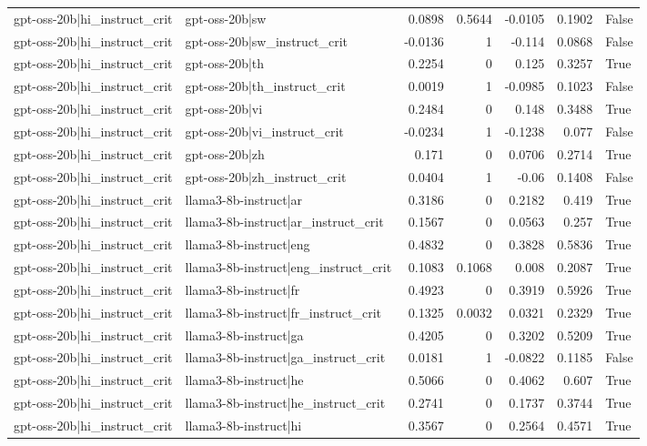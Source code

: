 \begin{table}
\begin{tabular}{l l r r r r l}
gpt-oss-20b|hi_instruct_crit & gpt-oss-20b|sw & 0.0898 & 0.5644 & -0.0105 & 0.1902 & False \\
gpt-oss-20b|hi_instruct_crit & gpt-oss-20b|sw_instruct_crit & -0.0136 & 1 & -0.114 & 0.0868 & False \\
gpt-oss-20b|hi_instruct_crit & gpt-oss-20b|th & 0.2254 & 0 & 0.125 & 0.3257 & True \\
gpt-oss-20b|hi_instruct_crit & gpt-oss-20b|th_instruct_crit & 0.0019 & 1 & -0.0985 & 0.1023 & False \\
gpt-oss-20b|hi_instruct_crit & gpt-oss-20b|vi & 0.2484 & 0 & 0.148 & 0.3488 & True \\
gpt-oss-20b|hi_instruct_crit & gpt-oss-20b|vi_instruct_crit & -0.0234 & 1 & -0.1238 & 0.077 & False \\
gpt-oss-20b|hi_instruct_crit & gpt-oss-20b|zh & 0.171 & 0 & 0.0706 & 0.2714 & True \\
gpt-oss-20b|hi_instruct_crit & gpt-oss-20b|zh_instruct_crit & 0.0404 & 1 & -0.06 & 0.1408 & False \\
gpt-oss-20b|hi_instruct_crit & llama3-8b-instruct|ar & 0.3186 & 0 & 0.2182 & 0.419 & True \\
gpt-oss-20b|hi_instruct_crit & llama3-8b-instruct|ar_instruct_crit & 0.1567 & 0 & 0.0563 & 0.257 & True \\
gpt-oss-20b|hi_instruct_crit & llama3-8b-instruct|eng & 0.4832 & 0 & 0.3828 & 0.5836 & True \\
gpt-oss-20b|hi_instruct_crit & llama3-8b-instruct|eng_instruct_crit & 0.1083 & 0.1068 & 0.008 & 0.2087 & True \\
gpt-oss-20b|hi_instruct_crit & llama3-8b-instruct|fr & 0.4923 & 0 & 0.3919 & 0.5926 & True \\
gpt-oss-20b|hi_instruct_crit & llama3-8b-instruct|fr_instruct_crit & 0.1325 & 0.0032 & 0.0321 & 0.2329 & True \\
gpt-oss-20b|hi_instruct_crit & llama3-8b-instruct|ga & 0.4205 & 0 & 0.3202 & 0.5209 & True \\
gpt-oss-20b|hi_instruct_crit & llama3-8b-instruct|ga_instruct_crit & 0.0181 & 1 & -0.0822 & 0.1185 & False \\
gpt-oss-20b|hi_instruct_crit & llama3-8b-instruct|he & 0.5066 & 0 & 0.4062 & 0.607 & True \\
gpt-oss-20b|hi_instruct_crit & llama3-8b-instruct|he_instruct_crit & 0.2741 & 0 & 0.1737 & 0.3744 & True \\
gpt-oss-20b|hi_instruct_crit & llama3-8b-instruct|hi & 0.3567 & 0 & 0.2564 & 0.4571 & True \\

\end{tabular}
\end{table}
